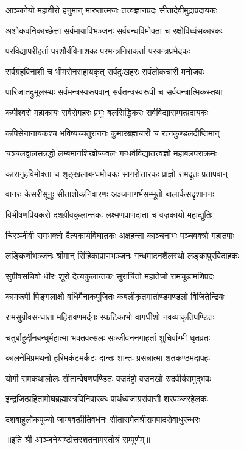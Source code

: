 

\twolineshloka
{आञ्जनेयो महावीरो हनुमान् मारुतात्मजः}
{तत्त्वज्ञानप्रदः सीतादेवीमुद्राप्रदायकः}

\twolineshloka
{अशोकवनिकाच्छेत्ता सर्वमायाविभञ्जनः}
{सर्वबन्धविमोक्ता च रक्षोविध्वंसकारकः}

\twolineshloka
{परविद्यापरीहर्ता परशौर्यविनाशकः}
{परमन्त्रनिराकर्ता परयन्त्रप्रभेदकः}

\twolineshloka
{सर्वग्रहविनाशी च भीमसेनसहायकृत्}
{सर्वदुःखहरः सर्वलोकचारी मनोजवः}

\twolineshloka
{पारिजातद्रुमूलस्थः सर्वमन्त्रस्वरूपवान्}
{सर्वतन्त्रस्वरूपी च सर्वयन्त्रात्मिकस्तथा}

\twolineshloka
{कपीश्वरो महाकायः सर्वरोगहरः प्रभुः}
{बलसिद्धिकरः सर्वविद्यासम्पत्प्रदायकः}

\twolineshloka
{कपिसेनानायकश्च भविष्यच्चतुराननः}
{कुमारब्रह्मचारी च रत्नकुण्डलदीप्तिमान्}

\twolineshloka
{चञ्चलद्वालसन्नद्धो लम्बमानशिखोज्ज्वलः}
{गन्धर्वविद्यातत्त्वज्ञो महाबलपराक्रमः}

\twolineshloka
{कारागृहविमोक्ता च शृङ्खलाबन्धमोचकः}
{सागरोत्तारकः प्राज्ञो रामदूतः प्रतापवान्}

\twolineshloka
{वानरः केसरीसूनुः सीताशोकनिवारणः}
{अञ्जनागर्भसम्भूतो बालार्कसदृशाननः}

\twolineshloka
{विभीषणप्रियकरो दशग्रीवकुलान्तकः}
{लक्ष्मणप्राणदाता च वज्रकायो महाद्युतिः}

\twolineshloka
{चिरञ्जीवी रामभक्तो दैत्यकार्यविघातकः}
{अक्षहन्ता काञ्चनाभः पञ्चवक्त्रो महातपाः}

\twolineshloka
{लङ्किणीभञ्जनः श्रीमान् सिंहिकाप्राणभञ्जनः}
{गन्धमादनशैलस्थो लङ्कापुरविदाहकः}

\twolineshloka
{सुग्रीवसचिवो धीरः शूरो दैत्यकुलान्तकः }
{सुरार्चितो महातेजो रामचूडामणिप्रदः}

\twolineshloka
{कामरूपी पिङ्गलाक्षो वर्धिमैनाकपूजितः}
{कबलीकृतमार्ताण्डमण्डलो विजितेन्द्रियः}

\twolineshloka
{रामसुग्रीवसन्धाता महिरावणमर्दनः}
{स्फटिकाभो वागधीशो नवव्याकृतिपण्डितः}

\twolineshloka
{चतुर्बाहुर्दीनबन्धुर्महात्मा भक्तवत्सलः}
{सञ्जीवननगाहर्ता शुचिर्वाग्मी धृतव्रतः}

\twolineshloka
{कालनेमिप्रमथनो हरिमर्कटमर्कटः}
{दान्तः शान्तः प्रसन्नात्मा शतकण्ठमदापहः}

\twolineshloka
{योगी रामकथालोलः सीतान्वेषणपण्डितः}
{वज्रदंष्ट्रो वज्रनखो रुद्रवीर्यसमुद्भवः}

\twolineshloka
{इन्द्रजित्प्रहितामोघब्रह्मास्त्रविनिवारकः}
{पार्थध्वजाग्रसंवासी शरपञ्जरहेलकः}

\twolineshloka
{दशबाहुर्लोकपूज्यो जाम्बवत्प्रीतिवर्धनः}
{सीतासमेतश्रीरामपादसेवाधुरन्धरः}

{॥इति श्री आञ्जनेयाष्टोत्तरशतनामस्तोत्रं सम्पूर्णम्॥}

